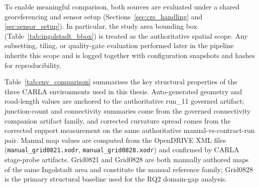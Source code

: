 To enable meaningful comparison, both sources are evaluated under a shared georeferencing and sensor setup (Sections~\ref{sec:crs_handling} and \ref{sec:sensor_setup}). In particular, the study area bounding box (Table~\ref{tab:ingolstadt_bbox}) is treated as the authoritative spatial scope. Any subsetting, tiling, or quality-gate evaluation performed later in the pipeline inherits this scope and is logged together with configuration snapshots and hashes for reproducibility.

Table~\ref{tab:env_comparison} summarises the key structural properties of the three CARLA environments used in this thesis. Auto-generated geometry and road-length values are anchored to the authoritative run\_11 governed artifact; junction-count and connectivity summaries come from the governed connectivity companion artifact family, and corrected curvature spread comes from the corrected support measurement on the same authoritative manual-vs-contract-run pair. Manual map values are computed from the OpenDRIVE XML files (\texttt{manual\_grid0821.xodr}, \texttt{manual\_grid0828.xodr}) and confirmed by CARLA stage-probe artifacts. Grid0821 and Grid0828 are both manually authored maps of the same Ingolstadt area and constitute the manual reference family; Grid0828 is the primary structural baseline used for the RQ2 domain-gap analysis.

